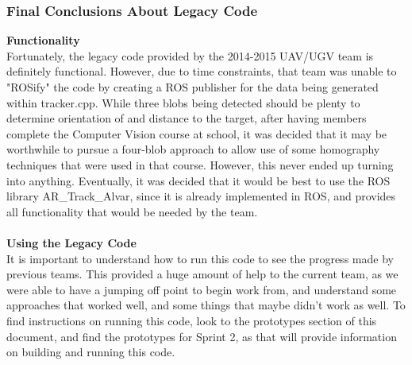 \subsubsection{Final Conclusions About Legacy Code}
\large{\textbf{Functionality}}\\
\normalsize
\noindent Fortunately, the legacy code provided by the 2014-2015 UAV/UGV team is definitely functional. However, due to time constraints, that team was unable to "ROSify" the code by creating a ROS publisher for the data being generated within tracker.cpp. While three blobs being detected should be plenty to determine orientation of and distance to the target, after having members complete the Computer Vision course at school, it was decided that it may be worthwhile to pursue a four-blob approach to allow use of some homography techniques that were used in that course. However, this never ended up turning into anything. Eventually, it was decided that it would be best to use the ROS library AR\_Track\_Alvar, since it is already implemented in ROS, and provides all functionality that would be needed by the team.\\\\
\large{\textbf{Using the Legacy Code}}\\
\normalsize
\noindent It is important to understand how to run this code to see the progress made by previous teams. This provided a huge amount of help to the current team, as we were able to have a jumping off point to begin work from, and understand some approaches that worked well, and some things that maybe didn't work as well. To find instructions on running this code, look to the prototypes section of this document, and find the prototypes for Sprint 2, as that will provide information on building and running this code. 




